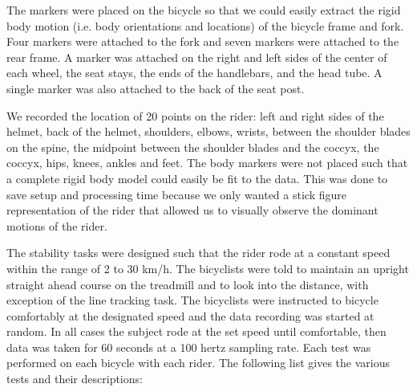The markers were placed on the bicycle so that we could easily extract the
rigid body motion (i.e. body orientations and locations) of the bicycle frame
and fork. Four markers were attached to the fork and seven markers were
attached to the rear frame. A marker was attached on the right and left sides
of the center of each wheel, the seat stays, the ends of the handlebars, and
the head tube. A single marker was also attached to the back of the seat post.

We recorded the location of 20 points on the rider: left and right sides of the
helmet, back of the helmet, shoulders, elbows, wrists, between the shoulder
blades on the spine, the midpoint between the shoulder blades and the coccyx,
the coccyx, hips, knees, ankles and feet. The body markers were not placed such
that a complete rigid body model could easily be fit to the data. This was done
to save setup and processing time because we only wanted a stick figure
representation of the rider that allowed us to visually observe the dominant
motions of the rider.

The stability tasks were designed such that the rider rode at a constant speed
within the range of 2 to 30 km/h. The bicyclists were told to maintain an
upright straight ahead course on the treadmill and to look into the distance,
with exception of the line tracking task. The bicyclists were instructed to
bicycle comfortably at the designated speed and the data recording was started
at random. In all cases the subject rode at the set speed until comfortable,
then data was taken for 60 seconds at a 100 hertz sampling rate. Each test was
performed on each bicycle with each rider. The following list gives the various
tests and their descriptions:

